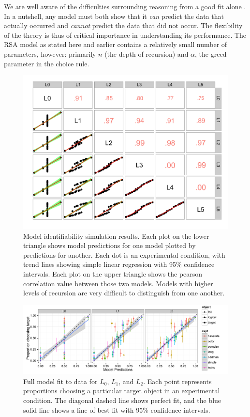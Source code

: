 \documentclass[man,noapacite]{apa2}
\begin{document}
We are well aware of the difficulties surrounding reasoning from a good fit alone \cite{roberts2000}. In a nutshell, any model must both show that it \emph{can} predict the data that actually occurred and \emph{cannot} predict the data that did not occur. The flexibility of the theory is thus of critical importance in understanding its performance. The RSA model as stated here and earlier contains a relatively small number of parameters, however: primarily $n$ (the depth of recursion) and $\alpha$, the greed parameter in the choice rule.

 \begin{figure}[t]
  \centering
  \includegraphics[width=6in]{../plots/models-2.pdf}
  \caption{\label{fig:models-2} Model identifiability simulation results. Each plot on the lower triangle shows model predictions for one model plotted by predictions for another. Each dot is an experimental condition, with trend lines showing simple linear regression with 95\% confidence intervals. Each plot on the upper triangle shows the pearson correlation value between those two models. Models with higher levels of recursion are very difficult to distinguish from one another.}
\end{figure}


 \begin{figure}[t]
  \centering
  \includegraphics[width=6in]{../plots/models-1.pdf}
  \caption{\label{fig:models-2} Full model fit to data for $L_0$, $L_1$, and $L_2$. Each point represents proportions choosing a particular target object in an experimental condition. The diagonal dashed line shows perfect fit, and the blue solid line shows a line of best fit with 95\% confidence intervals.}
\end{figure}
\end{document}
